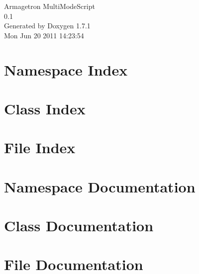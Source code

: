 \documentclass[a4paper]{book}
\begin{document}
\hypersetup{pageanchor=false}
\begin{titlepage}
\vspace*{7cm}
\begin{center}
{\Large Armagetron MultiModeScript \\[1ex]\large 0.1 }\\
\vspace*{1cm}
{\large Generated by Doxygen 1.7.1}\\
\vspace*{0.5cm}
{\small Mon Jun 20 2011 14:23:54}\\
\end{center}
\end{titlepage}
\clearemptydoublepage
{}
\tableofcontents
\clearemptydoublepage
{}
\hypersetup{pageanchor=true}
\chapter{Namespace Index}

\chapter{Class Index}

\chapter{File Index}

\chapter{Namespace Documentation}





\chapter{Class Documentation}










\chapter{File Documentation}














\printindex
\end{document}
